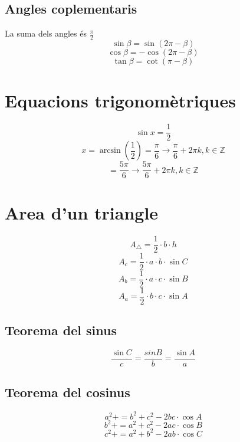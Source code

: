 \documentclass[12pt,a4paper]{article}
\newcommand{\naturals}{\mathbb{Z}}
\begin{document}
\subsection{Angles coplementaris}
La suma dels angles és $\frac{\pi}{2}$
$$\sin \beta = \sin(2\pi - \beta)$$
$$\cos \beta = -\cos(2\pi-\beta)$$
$$\tan \beta = \cot(\pi-\beta)$$
\section{Equacions trigonomètriques}
$$\sin x = \frac{1}{2}$$
$$x=\arcsin\left(\frac{1}{2}\right)=\frac{\pi}{6} \rightarrow \frac{\pi}{6}+2\pi k, k \in \naturals$$
$$=\frac{5\pi}{6}\rightarrow \frac{5\pi}{6}+2\pi k, k \in \naturals$$
\section{Area d'un triangle}
$$A_{\triangle}=\frac{1}{2}\cdot b \cdot h$$
$$A_c=\frac{1}{2}\cdot a \cdot b \cdot \sin C$$
$$A_b=\frac{1}{2}\cdot a \cdot c \cdot \sin B$$
$$A_a=\frac{1}{2}\cdot b \cdot c \cdot \sin A$$
\subsection{Teorema del sinus}
$$\frac{\sin C}{c}=\frac{sin B}{b}=\frac{\sin A}{a}$$
\subsection{Teorema del cosinus}
$$a^2+=b^2+c^2-2bc\cdot \cos A$$
$$b^2+=a^2+c^2-2ac\cdot \cos B$$
$$c^2+=a^2+b^2-2ab\cdot \cos C$$
\end{document}
